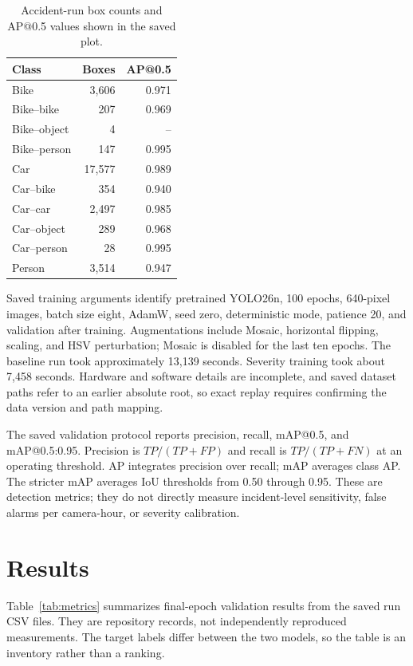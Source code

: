 \documentclass[12pt,a4paper]{article}
\begin{document}
\begin{table}[t]\centering\small
\caption{Accident-run box counts and AP@0.5 values shown in the saved plot.}
\label{tab:classes}
\begin{tabular}{lrr}\toprule
Class & Boxes & AP@0.5\\\midrule
Bike & 3,606 & 0.971\\
Bike--bike & 207 & 0.969\\
Bike--object & 4 & --\\
Bike--person & 147 & 0.995\\
Car & 17,577 & 0.989\\
Car--bike & 354 & 0.940\\
Car--car & 2,497 & 0.985\\
Car--object & 289 & 0.968\\
Car--person & 28 & 0.995\\
Person & 3,514 & 0.947\\\bottomrule
\end{tabular}
\end{table}

Saved training arguments identify pretrained YOLO26n, 100 epochs, 640-pixel images, batch size eight, AdamW, seed zero, deterministic mode, patience 20, and validation after training. Augmentations include Mosaic, horizontal flipping, scaling, and HSV perturbation; Mosaic is disabled for the last ten epochs. The baseline run took approximately 13,139 seconds. Severity training took about 7,458 seconds. Hardware and software details are incomplete, and saved dataset paths refer to an earlier absolute root, so exact replay requires confirming the data version and path mapping.

The saved validation protocol reports precision, recall, mAP@0.5, and mAP@0.5:0.95. Precision is $TP/(TP+FP)$ and recall is $TP/(TP+FN)$ at an operating threshold. AP integrates precision over recall; mAP averages class AP. The stricter mAP averages IoU thresholds from 0.50 through 0.95. These are detection metrics; they do not directly measure incident-level sensitivity, false alarms per camera-hour, or severity calibration.

\section{Results}
Table~\ref{tab:metrics} summarizes final-epoch validation results from the saved run CSV files. They are repository records, not independently reproduced measurements. The target labels differ between the two models, so the table is an inventory rather than a ranking.
\end{document}

